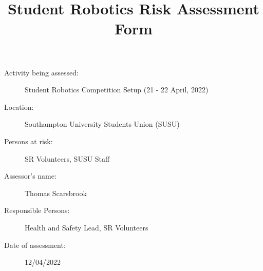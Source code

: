\documentclass[12pt,a4paper]{scrartcl}
\title{Student Robotics Risk Assessment Form}
\begin{document}
\maketitle

\begin{description}
\item[Activity being assessed:] Student Robotics Competition Setup (21 - 22 April, 2022)
\item[Location:] Southampton University Students Union (SUSU)
\item[Persons at risk:] SR Volunteers, SUSU Staff
\end{description}

\begin{description}
\item[Assessor's name:] Thomas Scarsbrook
\item[Responsible Persons:] Health and Safety Lead, SR Volunteers
\item[Date of assessment:] 12/04/2022
\end{description}
\clearpage

\renewcommand{\cellalign}{tl}
\renewcommand{\theadalign}{tl}

\newcommand{\risk}[4]{
	#1 & #2 & #3 & #4 \\
}
\end{document}
